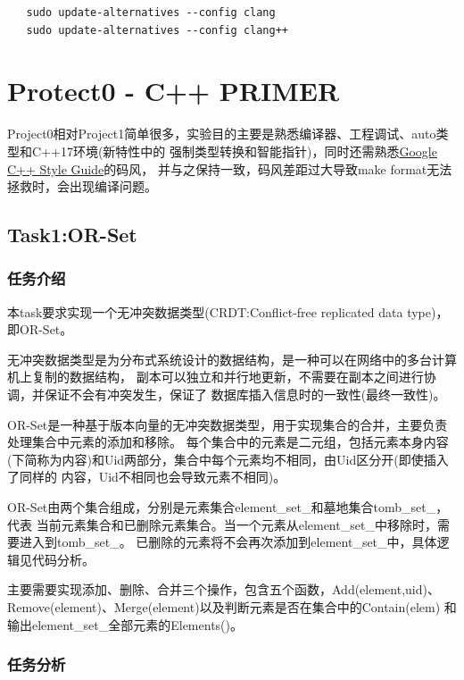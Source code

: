 \documentclass[a4paper]{article}
\begin{document}
\begin{verbatim}
   sudo update-alternatives --config clang
   sudo update-alternatives --config clang++
\end{verbatim}


\section{Protect0 - C++ PRIMER}

Project0相对Project1简单很多，实验目的主要是熟悉编译器、工程调试、auto类型和C++17环境(新特性中的
强制类型转换和智能指针)，同时还需熟悉\href{https://google.github.io/styleguide/cppguide.html}{Google C++ Style Guide}的码风，
并与之保持一致，码风差距过大导致make format无法拯救时，会出现编译问题。

\subsection{Task1:OR-Set}

\subsubsection{任务介绍}

本task要求实现一个无冲突数据类型(CRDT:Conflict-free replicated data type)，
即OR-Set。

无冲突数据类型是为分布式系统设计的数据结构，是一种可以在网络中的多台计算机上复制的数据结构，
副本可以独立和并行地更新，不需要在副本之间进行协调，并保证不会有冲突发生，保证了
数据库插入信息时的一致性(最终一致性)。

OR-Set是一种基于版本向量的无冲突数据类型，用于实现集合的合并，主要负责处理集合中元素的添加和移除。
每个集合中的元素是二元组，包括元素本身内容(下简称为内容)和Uid两部分，集合中每个元素均不相同，由Uid区分开(即使插入了同样的
内容，Uid不相同也会导致元素不相同)。

OR-Set由两个集合组成，分别是元素集合element\_set\_和墓地集合tomb\_set\_，代表
当前元素集合和已删除元素集合。当一个元素从element\_set\_中移除时，需要进入到tomb\_set\_。
已删除的元素将不会再次添加到element\_set\_中，具体逻辑见代码分析。

主要需要实现添加、删除、合并三个操作，包含五个函数，Add(element,uid)、
Remove(element)、Merge(element)以及判断元素是否在集合中的Contain(elem)
和输出element\_set\_全部元素的Elements()。

\subsubsection{任务分析}
\end{document}
